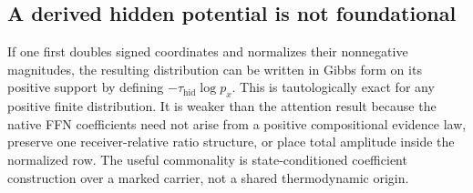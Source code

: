\subsection{A derived hidden potential is not foundational}

If one first doubles signed coordinates and normalizes their nonnegative magnitudes, the resulting distribution can be written in Gibbs form on its positive support by defining $-\tau_{\mathrm{hid}}\log p_x$. This is tautologically exact for any positive finite distribution. It is weaker than the attention result because the native FFN coefficients need not arise from a positive compositional evidence law, preserve one receiver-relative ratio structure, or place total amplitude inside the normalized row. The useful commonality is state-conditioned coefficient construction over a marked carrier, not a shared thermodynamic origin.

